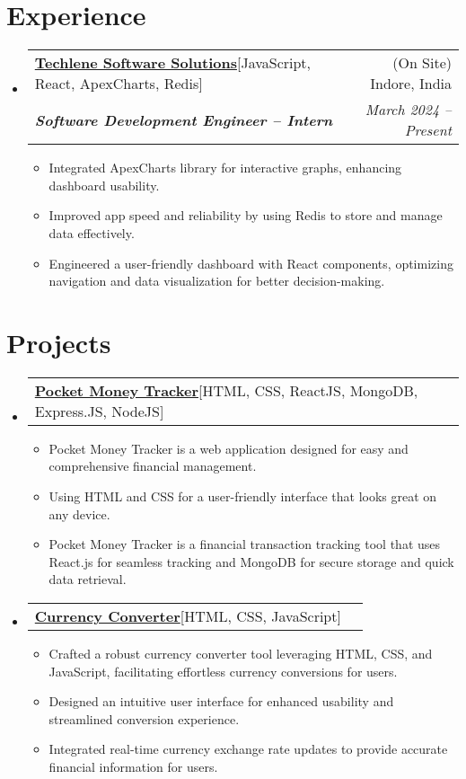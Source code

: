 \documentclass[letterpaper,11pt]{article}
\makeatletter
\newcommand{\resumeItem}[1]{
    \item\small{
      {#1 \vspace{-2pt}}
    }
  }
\newcommand{\resumeSubheading}[4]{
    \vspace{-2pt}\item
      \begin{tabular*}{0.97\textwidth}[t]{l@{\extracolsep{\fill}}r}
        {#1} & #2 \\
        \textit{\small#3} & \textit{\small #4}\\
      \end{tabular*}\vspace{-7pt}
  }
\newcommand{\resumeProjectHeading}[2]{
      \item
      \begin{tabular*}{0.97\textwidth}{l@{\extracolsep{\fill}}r}
        \small#1 & #2 \\
      \end{tabular*}\vspace{-7pt}
  }
\newcommand{\resumeSubHeadingListStart}{\begin{itemize}[leftmargin=0.15in, label={}]}
\newcommand{\resumeSubHeadingListEnd}{\end{itemize}}
\newcommand{\resumeItemListStart}{\begin{itemize}}
\newcommand{\resumeItemListEnd}{\end{itemize}\vspace{-5pt}}
\makeatother
\begin{document}

\section{Experience}
\resumeSubHeadingListStart

\resumeSubheading
{\textbf{\href{https://www.techlene.com/}{Techlene Software Solutions}\hspace{5pt}}{{[JavaScript, React, ApexCharts, Redis]}}}{(On Site) Indore, India}
{\textbf{Software Development Engineer – Intern}}{March 2024 -- Present}
\resumeItemListStart
\resumeItem{Integrated ApexCharts library for interactive graphs, enhancing dashboard usability.}
\resumeItem{ Improved app speed and reliability by using Redis to store and manage data effectively.}
\resumeItem{Engineered a user-friendly dashboard with React components, optimizing navigation and data visualization for better decision-making.}
\resumeItemListEnd
\resumeSubHeadingListEnd



\section{Projects}

\resumeSubHeadingListStart
\resumeProjectHeading
{\textbf{\href{https://money-tracker-app-gamma.vercel.app/}{Pocket Money Tracker}\hspace{5pt}}{[HTML, CSS, ReactJS, MongoDB, Express.JS, NodeJS]}}{}
\resumeItemListStart
\resumeItem{Pocket Money Tracker is a web application designed for easy and comprehensive financial management.}
\resumeItem{Using HTML and CSS for a user-friendly interface that looks great on any device.}
\resumeItem{Pocket Money Tracker is a financial transaction tracking tool that uses React.js for seamless tracking and MongoDB for secure storage and quick data retrieval.}
\resumeItemListEnd
\resumeSubHeadingListEnd

\resumeSubHeadingListStart
\resumeProjectHeading
{\textbf{\href{https://shanutiwari1010.github.io/currency-converter/}{Currency Converter}\hspace{5pt}}{{[HTML, CSS, JavaScript]}}}{}
\resumeItemListStart
\resumeItem{Crafted a robust currency converter tool leveraging HTML, CSS, and JavaScript, facilitating effortless currency conversions for users.}
\resumeItem{Designed an intuitive user interface for enhanced usability and streamlined conversion experience.}
\resumeItem{Integrated real-time currency exchange rate updates to provide accurate financial information for users.}
\resumeItemListEnd
\resumeSubHeadingListEnd
\end{document}
